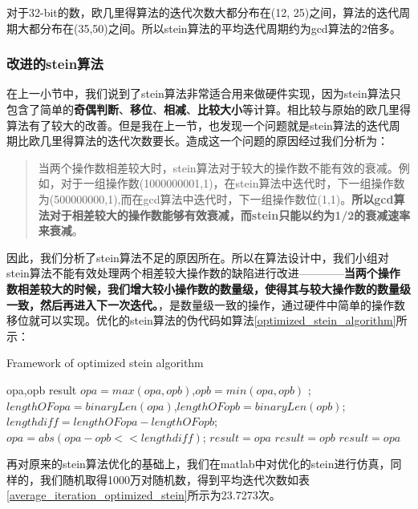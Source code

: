 \documentclass[12pt]{article}
\begin{document}
对于32-bit的数，欧几里得算法的迭代次数大都分布在(12, 25)之间，算法的迭代周期大都分布在(35,50)之间。所以stein算法的平均迭代周期约为gcd算法的2倍多。


\subsubsection{改进的stein算法}
在上一小节中，我们说到了stein算法非常适合用来做硬件实现，因为stein算法只包含了简单的\textbf{奇偶判断}、\textbf{移位}、\textbf{相减}、\textbf{比较大小}等计算。相比较与原始的欧几里得算法有了较大的改善。但是我在上一节，也发现一个问题就是stein算法的迭代周期比欧几里得算法的迭代次数要长。造成这一个问题的原因经过我们分析为：

\begin{quote}
当两个操作数相差较大时，stein算法对于较大的操作数不能有效的衰减。例如，对于一组操作数(1000000001,1)，在stein算法中迭代时，下一组操作数为(500000000,1),而在gcd算法中迭代时，下一组操作数位(1,1)。\textbf{所以gcd算法对于相差较大的操作数能够有效衰减，而stein只能以约为1/2的衰减速率来衰减}。
\end{quote}

因此，我们分析了stein算法不足的原因所在。所以在算法设计中，我们小组对stein算法不能有效处理两个相差较大操作数的缺陷进行改进————\textbf{当两个操作数相差较大的时候，我们增大较小操作数的数量级，使得其与较大操作数的数量级一致，然后再进入下一次迭代。}，是数量级一致的操作，通过硬件中简单的操作数移位就可以实现。优化的stein算法的伪代码如算法\ref{optimized_stein_algorithm}所示：

\begin{algorithm}[H]
\caption{ Framework of optimized stein algorithm} 
\label{optimized_stein_algorithm}  
\begin{algorithmic}[1]
\Require 
	opa,opb 
\Ensure
	result
	\State $opa = max(opa,opb)$,$opb = min(opa,opb)$ ;
	\State $lengthOFopa = binaryLen(opa)$,$lengthOFopb = binaryLen(opb)$;
 	\State $lengthdiff = lengthOFopa - lengthOFopb$;
 	\State $opa = abs(opa - opb << lengthdiff)$;
\EndWhile
{}
 \State $result = opa$
\EndIf
{}
 \State $result = opb$
\EndIf
{}
  \State $result = opa$
\EndIf
\end{algorithmic} 
\end{algorithm}

再对原来的stein算法优化的基础上，我们在matlab中对优化的stein进行仿真，同样的，我们随机取得1000万对随机数，得到平均迭代次数如表\ref{average_iteration_optimized_stein}所示为23.7273次。
\end{document}
